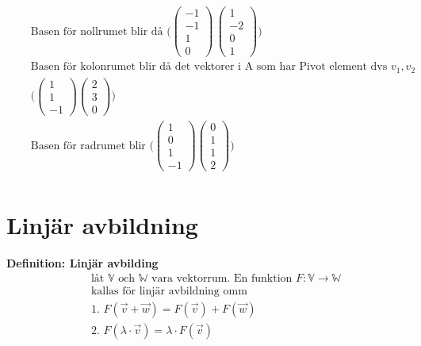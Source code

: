 \begin{align*}
  &\quad  \text{Basen för nollrumet blir då }
  \Big( \begin{pmatrix} -1 \\ -1 \\ 1 \\ 0 \end{pmatrix} \, \begin{pmatrix} 1 \\ -2 \\ 0 \\ 1 \end{pmatrix} \Big)  \\
  &\quad  \text{Basen för kolonrumet blir då det vektorer i A som har Pivot element dvs } v_1, v_2 \\
  &\quad
  \Big( \begin{pmatrix} 1 \\ 1 \\ -1 \end{pmatrix} \begin{pmatrix} 2 \\ 3 \\ 0 \end{pmatrix} \Big) \\
  &\quad  \text{Basen för radrumet blir }
  \Big( \begin{pmatrix} 1 \\ 0 \\ 1 \\ -1 \end{pmatrix} \begin{pmatrix} 0 \\ 1 \\ 1 \\ 2 \end{pmatrix} \Big) \\
\end{align*}


\newpage

\section{Linjär avbildning}
\textbf{Definition: Linjär avbilding}
\begin{align*}
  &\quad  \text{låt $\mathbb{V}$ och $\mathbb{W}$ vara vektorrum. En funktion } F:\mathbb{V}\to\mathbb{W} \\
  &\quad  \text{kallas för linjär avbildning omm} \\
  &\quad  \text{1. } F(\vec{v}+\vec{w}) = F(\vec{v}) + F(\vec{w}) \\
  &\quad  \text{2. } F(\lambda\cdot\vec{v}) = \lambda\cdot F(\vec{v}) \\
\end{align*}


